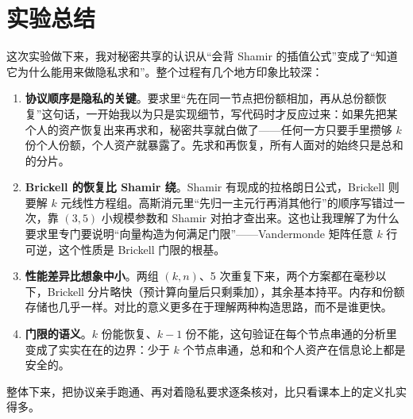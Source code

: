 \documentclass{SYSUReport}
\begin{document}
\section{实验总结}

这次实验做下来，我对秘密共享的认识从“会背 Shamir 的插值公式”变成了“知道它为什么能用来做隐私求和”。整个过程有几个地方印象比较深：

\begin{enumerate}
    \item \textbf{协议顺序是隐私的关键}。要求里“先在同一节点把份额相加，再从总份额恢复”这句话，一开始我以为只是实现细节，写代码时才反应过来：如果先把某个人的资产恢复出来再求和，秘密共享就白做了——任何一方只要手里攒够 $k$ 份个人份额，个人资产就暴露了。先求和再恢复，所有人面对的始终只是总和的分片。
    \item \textbf{Brickell 的恢复比 Shamir 绕}。Shamir 有现成的拉格朗日公式，Brickell 则要解 $k$ 元线性方程组。高斯消元里“先归一主元行再消其他行”的顺序写错过一次，靠 $(3,5)$ 小规模参数和 Shamir 对拍才查出来。这也让我理解了为什么要求里专门要说明“向量构造为何满足门限”——Vandermonde 矩阵任意 $k$ 行可逆，这个性质是 Brickell 门限的根基。
    \item \textbf{性能差异比想象中小}。两组 $(k,n)$、5 次重复下来，两个方案都在毫秒以下，Brickell 分片略快（预计算向量后只剩乘加），其余基本持平。内存和份额存储也几乎一样。对比的意义更多在于理解两种构造思路，而不是谁更快。
    \item \textbf{门限的语义}。$k$ 份能恢复、$k-1$ 份不能，这句验证在每个节点串通的分析里变成了实实在在的边界：少于 $k$ 个节点串通，总和和个人资产在信息论上都是安全的。
\end{enumerate}

整体下来，把协议亲手跑通、再对着隐私要求逐条核对，比只看课本上的定义扎实得多。
\end{document}
